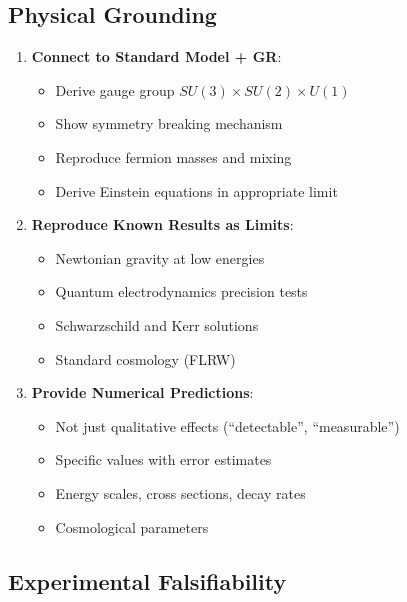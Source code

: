 \subsection{Physical Grounding}

\begin{enumerate}
    \item \textbf{Connect to Standard Model + GR}:
    \begin{itemize}
        \item Derive gauge group $SU(3) \times SU(2) \times U(1)$
        \item Show symmetry breaking mechanism
        \item Reproduce fermion masses and mixing
        \item Derive Einstein equations in appropriate limit
    \end{itemize}

    \item \textbf{Reproduce Known Results as Limits}:
    \begin{itemize}
        \item Newtonian gravity at low energies
        \item Quantum electrodynamics precision tests
        \item Schwarzschild and Kerr solutions
        \item Standard cosmology (FLRW)
    \end{itemize}

    \item \textbf{Provide Numerical Predictions}:
    \begin{itemize}
        \item Not just qualitative effects (``detectable'', ``measurable'')
        \item Specific values with error estimates
        \item Energy scales, cross sections, decay rates
        \item Cosmological parameters
    \end{itemize}
\end{enumerate}

\subsection{Experimental Falsifiability}

